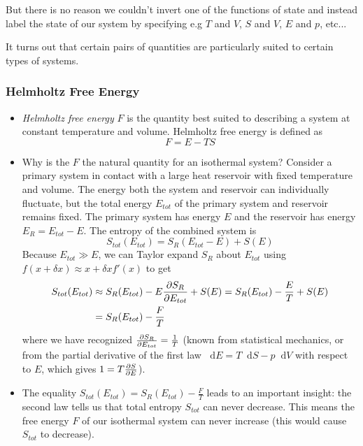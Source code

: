 \documentclass[11pt, a4paper]{article}
\newcommand{\diff}{\mathop{}\!\mathrm{d}} %
\begin{document}
But there is no reason we couldn't invert one of the functions of state and instead label the state of our system by specifying e.g $ T $ and $ V $, $ S $ and $ V $, $ E $ and $ p $, etc...

It turns out that certain pairs of quantities are particularly suited to certain types of systems. 

\subsubsection{Helmholtz Free Energy}
\begin{itemize}
	\item \textit{Helmholtz free energy} $ F $ is the quantity best suited to describing a system at constant temperature and volume. Helmholtz free energy is defined as
	\begin{equation*}
		F = E - TS
	\end{equation*}
	
	\item Why is the $ F $ the natural quantity for an isothermal system? Consider a primary system in contact with a large heat reservoir with fixed temperature and volume. The energy both the system and reservoir can individually fluctuate, but the total energy $ E_{tot} $ of the primary system and reservoir remains fixed. The primary system has energy $ E $ and the reservoir has energy $ E_{R} = E_{tot} - E $. The entropy of the combined system is
	\begin{equation*}
		S_{tot}(E_{tot}) = S_{R}(E_{tot} - E) + S(E)
	\end{equation*}
	Because $ E_{tot} \gg E $, we can Taylor expand $ S_{R} $ about $ E_{tot} $ using $ f(x + \delta x) \approx x + \delta x f'(x)$ to get
	\begin{align*}
		S_{tot}(E_{tot}) &\approx S_{R}(E_{tot}) - E \pdv{S_{R}}{E_{tot}} + S(E) = S_{R}(E_{tot}) - \frac{E}{T} + S(E) \\
		&= S_{R}(E_{tot}) - \frac{F}{T}
	\end{align*}
	where we have recognized $ \pdv{S_{R}}{E_{tot}} = \frac{1}{T} $ (known from statistical mechanics, or from the partial derivative of the first law $ \diff E = T \diff S - p \diff V $ with respect to $ E $, which gives $ 1 = T \pdv{S}{E} $).
	
	\item The equality $ S_{tot}(E_{tot}) = S_{R}(E_{tot}) - \frac{F}{T} $ leads to an important insight: the second law tells us that total entropy $ S_{tot} $ can never decrease. This means the free energy $ F $ of our isothermal system can never increase (this would cause $ S_{tot} $ to decrease).
	

\end{itemize}
\end{document}
